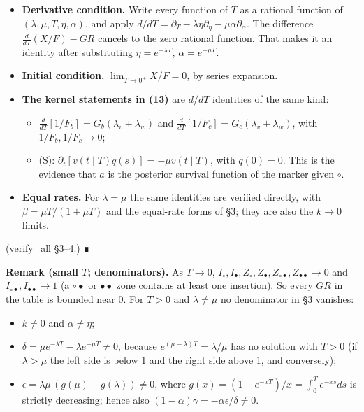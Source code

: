 \documentclass[10pt,]{article}
\providecommand{\tightlist}{%
  \setlength{\itemsep}{0pt}\setlength{\parskip}{0pt}}
\begin{document}
\begin{itemize}
\tightlist
\item
  \textbf{Derivative condition.} Write every function of \(T\) as a
  rational function of \((\lambda,\mu,T,\eta,\alpha)\), and apply
  \(d/dT=\partial_T-\lambda\eta\partial_\eta-\mu\alpha\partial_\alpha\).
  The difference \(\frac{d}{dT}(X/F)-GR\) cancels to the zero rational
  function. That makes it an identity after substituting
  \(\eta=e^{-\lambda T}\), \(\alpha=e^{-\mu T}\).
\item
  \textbf{Initial condition.} \(\lim_{T\to0^+}X/F=0\), by series
  expansion.
\item
  \textbf{The kernel statements in (13)} are \(d/dT\) identities of the
  same kind:

  \begin{itemize}
  \tightlist
  \item
    \(\frac{d}{dT}[1/F_b]=G_b(\lambda_v+\lambda_w)\) and
    \(\frac{d}{dT}[1/F_c]=G_c(\lambda_v+\lambda_w)\), with
    \(1/F_b,1/F_c\to0\);
  \item
    (S): \(\partial_t[v(t\mid T)q(s)]=-\mu v(t\mid T)\), with
    \(q(0)=0\). This is the evidence that \(a\) is the posterior
    survival function of the marker given \(\circ\).
  \end{itemize}
\item
  \textbf{Equal rates.} For \(\lambda=\mu\) the same identities are
  verified directly, with \(\beta=\mu T/(1+\mu T)\) and the equal-rate
  forms of §3; they are also the \(k\to0\) limits.
\end{itemize}

(verify\_all §3--4.) ∎

\textbf{Remark (small \(T\); denominators).} As \(T\to0\),
\(I_\circ,I_\bullet,Z_\circ,Z_\bullet,Z_{\circ\bullet},Z_{\bullet\bullet}\to0\)
and \(I_{\circ\bullet},I_{\bullet\bullet}\to1\) (a \(\circ\bullet\) or
\(\bullet\bullet\) zone contains at least one insertion). So every
\(GR\) in the table is bounded near 0. For \(T>0\) and \(\lambda\ne\mu\)
no denominator in §3 vanishes:

\begin{itemize}
\tightlist
\item
  \(k\ne0\) and \(\alpha\ne\eta\);
\item
  \(\delta=\mu e^{-\lambda T}-\lambda e^{-\mu T}\ne0\), because
  \(e^{(\mu-\lambda)T}=\lambda/\mu\) has no solution with \(T>0\) (if
  \(\lambda>\mu\) the left side is below 1 and the right side above 1,
  and conversely);
\item
  \(\epsilon=\lambda\mu\,(g(\mu)-g(\lambda))\ne0\), where
  \(g(x)=(1-e^{-xT})/x=\int_0^Te^{-xs}ds\) is strictly decreasing; hence
  also \((1-\alpha)\gamma=-\alpha\epsilon/\delta\ne0\).
\end{itemize}
\end{document}
